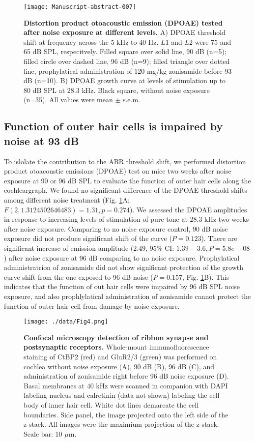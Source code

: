 \documentclass[11pt]{article}
\begin{document}
\begin{figure}[ht!]
\centering
\texttt{[image: Manuscript-abstract-007]}
\caption{{\bf {Distortion product otoacoustic emission (DPOAE) tested after noise exposure at different levels.}} A) DPOAE threshold shift at frequency across the 5 kHz to 40 Hz. $L1$ and $L2$ were 75 and 65 dB SPL, respecitvely. Filled square over solid line, 90 dB (n=5); filled circle over dashed line, 96 dB (n=9); filled triangle over dotted line, prophylatical administration of 120 mg/kg zonisamide before 93 dB (n=10). B) DPOAE growth curve at levels of stimulation up to 80 dB SPL at 28.3 kHz. Black square, without noise exposure (n=35). All values were  mean $\pm$ s.e.m. }
\label{fig:Figure3}
\end{figure}

\subsection {Function of outer hair cells is impaired by noise at 93 dB}
To islolate the contribution to the ABR threshold shift, we performed distortion product otoacoustic emissions (DPOAE) test on mice two weeks after noise exposure at 90 or 96 dB SPL to evaluate the function of outer hair cells along the cochleargraph. We found no significant difference of the DPOAE threshold shifts among different noise treatment 
(Fig. \ref{fig:Figure3}A; $F(2,1.3124502646483)=1.31,
 p=0.274$). We assessed the DPOAE amplitudes in response to increasing levels of stimulation of pure tone at 28.3 kHz two weeks after noise exposure. Comparing to no noise exposure control, 90 dB noise exposure did not produce significant shift of the curve 
($P=0.123$). There are significant increase of emission amplitude ($2.49$, 95\% CI: $1.39 - 3.6, P= 5.8e-08$) after noise exposure at 96 dB comparing to no noise exposure. Prophylatical administratrion of zonisamide did not show significant protection of the growth curve shift from the one exposed to 96 dB noise ($P=0.157$, Fig. \ref{fig:Figure3}B).  
 This indicates that the function of out hair cells were impaired by 96 dB SPL noise exposure, and also prophlylatical administration of zonisamide cannot protect the function of outer hair cell from damage by noise exposure.

\begin{figure}[ht!]
\centering
\texttt{[image: ./data/Fig4.png]}
\caption{{\bf {Confocal microscopy detection of ribbon synapse and postsynaptic receptors.}}  Whole-mount immunofluorescence staining of CtBP2 (red) and GluR2/3 (green) was performed on cochlea without noise exposure (A), 90 dB (B), 96 dB (C), and administration of zonisamide right before 96 dB noise exposure (D). Basal membranes at 40 kHz were scanned in companion with DAPI labeling nucleus and calretinin (data not shown) labeling the cell body of inner hair cell. White dot lines demarcate the cell boundaries. Side panel, the image projected onto the left side of the z-stack. All images were the maximium projection of the z-stack. Scale bar: 10 $\mu$m. }
\label{fig:Figure4}
\end{figure}
\end{document}

